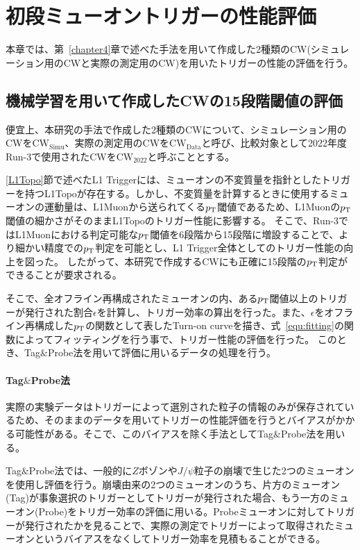 \chapter{初段ミューオントリガーの性能評価}\label{chapter5}
本章では、第~\ref{chapter4}章で述べた手法を用いて作成した2種類のCW(シミュレーション用のCWと実際の測定用のCW)を用いたトリガーの性能の評価を行う。

\section{機械学習を用いて作成したCWの15段階閾値の評価}
便宜上、本研究の手法で作成した2種類のCWについて、シミュレーション用のCWを$\mathrm{CW_{Simu}}$、実際の測定用のCWを$\mathrm{CW_{Data}}$と呼び、比較対象として2022年度Run-3で使用されたCWを$\mathrm{CW_{2022}}$と呼ぶこととする。

\ref{L1Topo}節で述べたL1 Triggerには、ミューオンの不変質量を指針としたトリガーを持つL1Topoが存在する。しかし、不変質量を計算するときに使用するミューオンの運動量は、L1Muonから送られてくる$p_{\rm{T}}$閾値であるため、L1Muonの$p_{\rm{T}}$閾値の細かさがそのままL1Topoのトリガー性能に影響する。
そこで、Run-3ではL1Muonにおける判定可能な$p_{\rm{T}}$閾値を6段階から15段階に増設することで、より細かい精度での$p_{\rm{T}}$判定を可能とし、L1 Trigger全体としてのトリガー性能の向上を図った。
したがって、本研究で作成するCWにも正確に15段階の$p_{\rm{T}}$判定ができることが要求される。

そこで、全オフライン再構成されたミューオンの内、ある$p_{\rm{T}}$閾値以上のトリガーが発行された割合$\epsilon$を計算し、トリガー効率の算出を行った。また、$\epsilon$をオフライン再構成した$p_{\rm{T}}$の関数として表したTurn-on curveを描き、式~\eqref{equ:fitting}の関数によってフィッティングを行う事で、トリガー性能の評価を行った。
このとき、Tag$\&$Probe法を用いて評価に用いるデータの処理を行う。

\subsubsection{Tag$\&$Probe法}
実際の実験データはトリガーによって選別された粒子の情報のみが保存されているため、そのままのデータを用いてトリガーの性能評価を行うとバイアスがかかる可能性がある。そこで、このバイアスを除く手法としてTag$\&$Probe法を用いる。

Tag$\&$Probe法では、一般的に$Z$ボゾンや$J/\psi$粒子の崩壊で生じた2つのミューオンを使用し評価を行う。崩壊由来の2つのミューオンのうち、片方のミューオン(Tag)が事象選択のトリガーとしてトリガーが発行された場合、もう一方のミューオン(Probe)をトリガー効率の評価に用いる。Probeミューオンに対してトリガーが発行されたかを見ることで、実際の測定でトリガーによって取得されたミューオンというバイアスをなくしてトリガー効率を見積もることができる。

